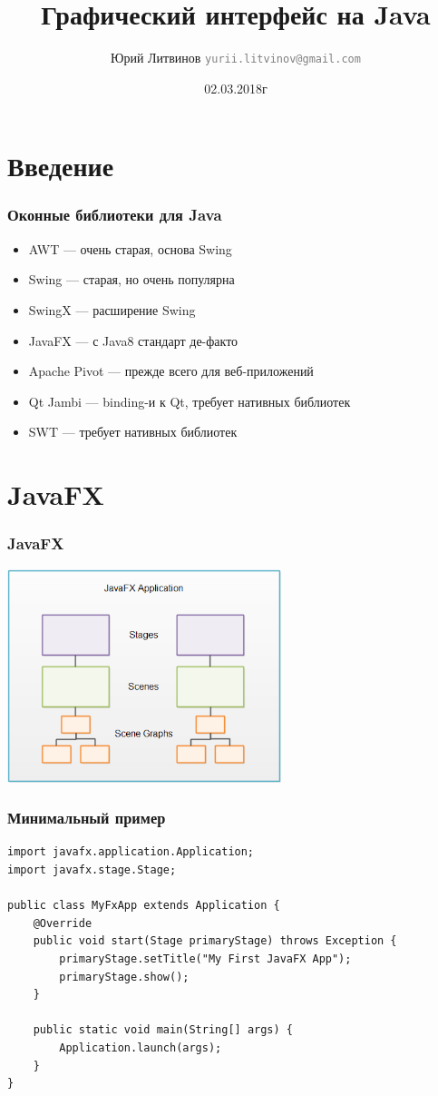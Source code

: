 \documentclass[xetex,mathserif,serif]{beamer}
\title{Графический интерфейс на Java}
\author[Юрий Литвинов]{Юрий Литвинов \newline \textcolor{gray}{\small\texttt{yurii.litvinov@gmail.com}}}
\date{02.03.2018г}
\begin{document}
	
	\frame{\titlepage}
	
	\section{Введение}

	\begin{frame}
		\frametitle{Оконные библиотеки для Java}
		\begin{itemize}
			\item AWT --- очень старая, основа Swing
			\item Swing --- старая, но очень популярна
			\item SwingX --- расширение Swing
			\item JavaFX --- с Java8 стандарт де-факто
			\item Apache Pivot --- прежде всего для веб-приложений
			\item Qt Jambi --- binding-и к Qt, требует нативных библиотек
			\item SWT --- требует нативных библиотек
		\end{itemize}
	\end{frame}

	\section{JavaFX}

	\begin{frame}
		\frametitle{JavaFX}
		\begin{center}
			\includegraphics[width=0.6\textwidth]{javaFxOverview.png}
		\end{center}
	\end{frame}

	\begin{frame}[fragile]
		\frametitle{Минимальный пример}
		\begin{verbatim}
import javafx.application.Application;
import javafx.stage.Stage;

public class MyFxApp extends Application {
    @Override
    public void start(Stage primaryStage) throws Exception {
        primaryStage.setTitle("My First JavaFX App");
        primaryStage.show();
    }
    
    public static void main(String[] args) {
        Application.launch(args);
    }
}
		\end{verbatim}
	\end{frame}
\end{document}
